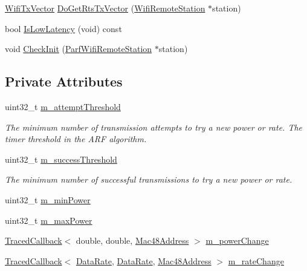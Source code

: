 \begin{DoxyCompactItemize}
\item 
\hyperlink{classns3_1_1WifiTxVector}{Wifi\+Tx\+Vector} \hyperlink{classns3_1_1ParfWifiManager_a693981d57d5f1bdce6a80acf2b0f36a2}{Do\+Get\+Rts\+Tx\+Vector} (\hyperlink{structns3_1_1WifiRemoteStation}{Wifi\+Remote\+Station} $\ast$station)
\item 
bool \hyperlink{classns3_1_1ParfWifiManager_a7c57ea050a39f627afd33be69ef95291}{Is\+Low\+Latency} (void) const 
\item 
void \hyperlink{classns3_1_1ParfWifiManager_a2a7ea7d1accf1ce9056c91929db2e7eb}{Check\+Init} (\hyperlink{structns3_1_1ParfWifiRemoteStation}{Parf\+Wifi\+Remote\+Station} $\ast$station)
\end{DoxyCompactItemize}
\subsection*{Private Attributes}
\begin{DoxyCompactItemize}
\item 
uint32\+\_\+t \hyperlink{classns3_1_1ParfWifiManager_aab9760bab8628fc4822c12b2dd2bf0ea}{m\+\_\+attempt\+Threshold}
\begin{DoxyCompactList}\small\item\em The minimum number of transmission attempts to try a new power or rate. The \textquotesingle{}timer\textquotesingle{} threshold in the A\+RF algorithm. \end{DoxyCompactList}\item 
uint32\+\_\+t \hyperlink{classns3_1_1ParfWifiManager_a20cddc69111e0c419ae3f4c36e4d4548}{m\+\_\+success\+Threshold}
\begin{DoxyCompactList}\small\item\em The minimum number of successful transmissions to try a new power or rate. \end{DoxyCompactList}\item 
uint32\+\_\+t \hyperlink{classns3_1_1ParfWifiManager_a24ec3d3ef17fc4bc51d25d95c5e03a9b}{m\+\_\+min\+Power}
\item 
uint32\+\_\+t \hyperlink{classns3_1_1ParfWifiManager_a6894ea0155e04eab0db55007342d5a78}{m\+\_\+max\+Power}
\item 
\hyperlink{classns3_1_1TracedCallback}{Traced\+Callback}$<$ double, double, \hyperlink{classns3_1_1Mac48Address}{Mac48\+Address} $>$ \hyperlink{classns3_1_1ParfWifiManager_a3551006adb796a78525bc93430950b21}{m\+\_\+power\+Change}
\item 
\hyperlink{classns3_1_1TracedCallback}{Traced\+Callback}$<$ \hyperlink{classns3_1_1DataRate}{Data\+Rate}, \hyperlink{classns3_1_1DataRate}{Data\+Rate}, \hyperlink{classns3_1_1Mac48Address}{Mac48\+Address} $>$ \hyperlink{classns3_1_1ParfWifiManager_a6523cc884410af743890db3d24970f70}{m\+\_\+rate\+Change}
\end{DoxyCompactItemize}
